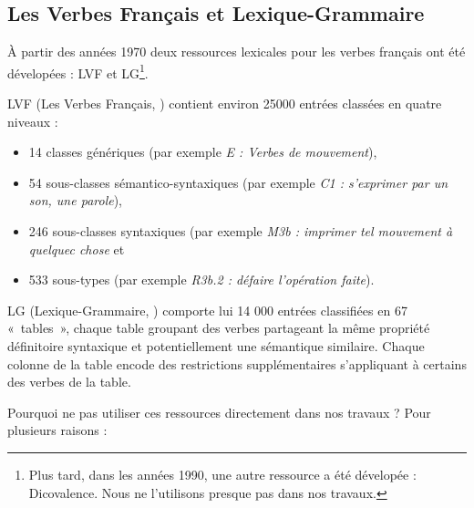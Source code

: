 
\subsection{Les Verbes Français et Lexique-Grammaire}
\label{sec:lvflg}

À partir des années 1970 deux ressources lexicales pour les verbes français ont
été dévelopées : LVF et LG\footnote{Plus tard, dans les années 1990, une autre
    ressource a été dévelopée : Dicovalence. Nous ne l'utilisons presque pas
dans nos travaux.}.

LVF (Les Verbes Français, \cite{dubois1997verbes}) contient environ 25000
entrées classées en quatre niveaux :

\begin{itemize}

    \item 14 classes génériques (par exemple \emph{E : Verbes de mouvement}),

    \item 54 sous-classes sémantico-syntaxiques (par exemple \emph{C1 :
        s'exprimer par un son, une parole}),

    \item 246 sous-classes syntaxiques (par exemple \emph{M3b : imprimer tel
        mouvement à quelquec chose} et

    \item 533 sous-types (par exemple \emph{R3b.2 : défaire l'opération
        faite}).

\end{itemize}


LG (Lexique-Grammaire, \cite{gross1975methodes,boons1976structure}) comporte
lui 14 000 entrées classifiées en 67 «~tables~», chaque table groupant des
verbes partageant la même propriété définitoire syntaxique et potentiellement
une sémantique similaire. Chaque colonne de la table encode des restrictions
supplémentaires s'appliquant à certains des verbes de la table.


Pourquoi ne pas utiliser ces ressources directement dans nos travaux ? Pour
plusieurs raisons :

